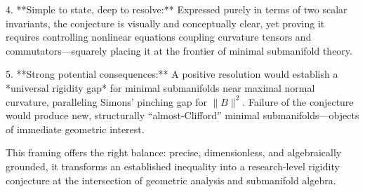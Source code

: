 4. **Simple to state, deep to resolve:**  
   Expressed purely in terms of two scalar invariants, the conjecture is visually and conceptually clear, yet proving it requires controlling nonlinear equations coupling curvature tensors and commutators—squarely placing it at the frontier of minimal submanifold theory.

5. **Strong potential consequences:**  
   A positive resolution would establish a *universal rigidity gap* for minimal submanifolds near maximal normal curvature, paralleling Simons’ pinching gap for \(\|B\|^2\).  Failure of the conjecture would produce new, structurally “almost-Clifford” minimal submanifolds—objects of immediate geometric interest.

This framing offers the right balance: precise, dimensionless, and algebraically grounded, it transforms an established inequality into a research-level rigidity conjecture at the intersection of geometric analysis and submanifold algebra.